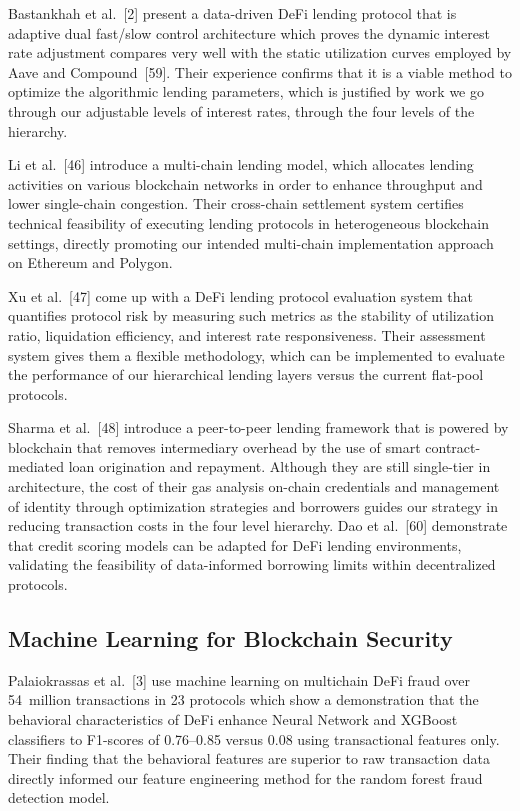 \documentclass[12pt,a4paper]{report}
\begin{document}
Bastankhah et al.~[2] present a data-driven DeFi lending protocol that is adaptive dual fast/slow control architecture which proves the dynamic interest rate adjustment compares very well with the static utilization curves employed by Aave and Compound~[59]. Their experience confirms that it is a viable method to optimize the algorithmic lending parameters, which is justified by work we go through our adjustable levels of interest rates, through the four levels of the hierarchy.

Li et al.~[46] introduce a multi-chain lending model, which allocates lending activities on various blockchain networks in order to enhance throughput and lower single-chain congestion. Their cross-chain settlement system certifies technical feasibility of executing lending protocols in heterogeneous blockchain settings, directly promoting our intended multi-chain implementation approach on Ethereum and Polygon.

Xu et al.~[47] come up with a DeFi lending protocol evaluation system that quantifies protocol risk by measuring such metrics as the stability of utilization ratio, liquidation efficiency, and interest rate responsiveness. Their assessment system gives them a flexible methodology, which can be implemented to evaluate the performance of our hierarchical lending layers versus the current flat-pool protocols.

Sharma et al.~[48] introduce a peer-to-peer lending framework that is powered by blockchain that removes intermediary overhead by the use of smart contract-mediated loan origination and repayment. Although they are still single-tier in architecture, the cost of their gas analysis on-chain credentials and management of identity through optimization strategies and borrowers guides our strategy in reducing transaction costs in the four level hierarchy. Dao et al.~[60] demonstrate that credit scoring models can be adapted for DeFi lending environments, validating the feasibility of data-informed borrowing limits within decentralized protocols.

\subsection{Machine Learning for Blockchain Security}

Palaiokrassas et al.~[3] use machine learning on multichain DeFi fraud over 54~million transactions in 23 protocols which show a demonstration that the behavioral characteristics of DeFi enhance Neural Network and XGBoost classifiers to F1-scores of 0.76--0.85 versus 0.08 using transactional features only. Their finding that the behavioral features are superior to raw transaction data directly informed our feature engineering method for the random forest fraud detection model.
\end{document}
